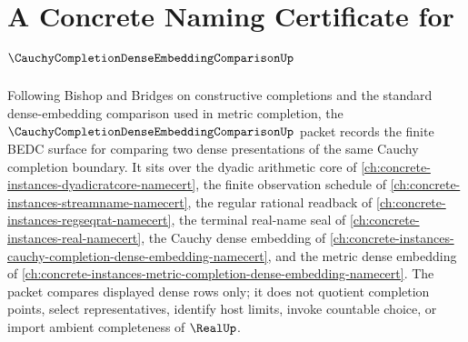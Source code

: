 \chapter{A Concrete Naming Certificate for $\CauchyCompletionDenseEmbeddingComparisonUp$}
\label{ch:concrete-instances-cauchy-completion-dense-embedding-comparison-namecert}

Following Bishop and Bridges on constructive completions and the standard dense-embedding comparison used in metric completion, the $\CauchyCompletionDenseEmbeddingComparisonUp$ packet records the finite BEDC surface for comparing two dense presentations of the same Cauchy completion boundary. It sits over the dyadic arithmetic core of \autoref{ch:concrete-instances-dyadicratcore-namecert}, the finite observation schedule of \autoref{ch:concrete-instances-streamname-namecert}, the regular rational readback of \autoref{ch:concrete-instances-regseqrat-namecert}, the terminal real-name seal of \autoref{ch:concrete-instances-real-namecert}, the Cauchy dense embedding of \autoref{ch:concrete-instances-cauchy-completion-dense-embedding-namecert}, and the metric dense embedding of \autoref{ch:concrete-instances-metric-completion-dense-embedding-namecert}. The packet compares displayed dense rows only; it does not quotient completion points, select representatives, identify host limits, invoke countable choice, or import ambient completeness of $\RealUp$.


